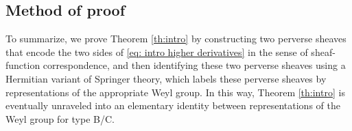 

%


\subsection{Method of proof}\label{ssec: overview of proof} To summarize, we prove Theorem \ref{th:intro} by constructing two perverse sheaves that encode the two sides of \eqref{eq: intro higher derivatives} in the sense of sheaf-function correspondence, and then identifying these two perverse sheaves using a Hermitian variant of Springer theory, which labels these perverse sheaves by representations of the appropriate Weyl group. In this way, Theorem \ref{th:intro} is eventually unraveled into an elementary identity between representations of the Weyl group for type B/C.




